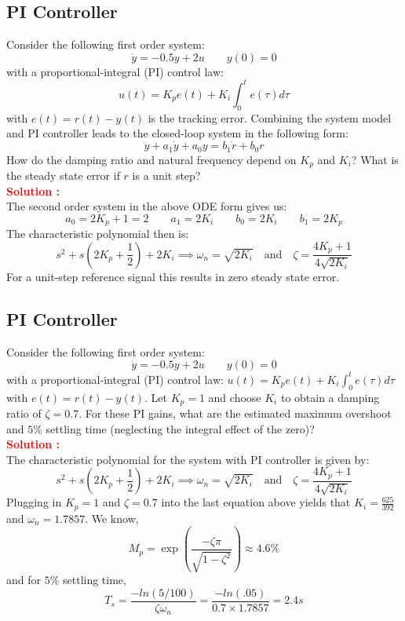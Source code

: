 \documentclass[12pt]{article}
\begin{document}
\subsection{PI Controller}

Consider the following first order system:
\[
\dot{y} = -0.5y + 2u \qquad  y(0) = 0
\]
with a proportional-integral (PI) control law: 
$$u(t)=K_p e(t)+K_i \int_0^t e(\tau) d \tau$$ with $e(t)=r(t)-y(t)$ is the tracking error. Combining the system model and PI controller leads to the closed-loop system in the following form:
\[
\ddot{y}+ a_1 \dot{y} + a_0 y = b_1 \dot{r} + b_0 r
\]
How do the damping ratio and natural frequency depend on $K_p$ and $K_i$? What is the steady state error if $r$ is a unit step? \\
\textbf{\textcolor{red}{Solution :}} \\
The second order system in the above ODE form gives us:
\[
a_0 = 2K_p + 1=2 \qquad  a_1 = 2K_i \qquad b_0 = 2K_i \qquad b_1 = 2K_p
\]
The characteristic polynomial then is:
\[
s^2 + s (2K_p + \frac{1}{2}) + 2K_i \implies \omega_n = \sqrt{2K_i} \quad \text{and} \quad \zeta = \frac{4K_p + 1}{4\sqrt{2K_i}}
\]
For a unit-step reference signal this results in zero steady state error.
\clearpage

\subsection{PI Controller}

Consider the following first order system:
\[
\dot{y} = -0.5y + 2u \qquad  y(0) = 0
\]
with a proportional-integral (PI) control law:  $u(t)=K_p e(t)+K_i \int_0^t e(\tau) d \tau$ with $e(t)=r(t)-y(t)$. Let $K_p=1$ and choose $K_i$ to obtain a damping ratio of $\zeta = 0.7$.  For these PI gains, what are the estimated maximum overshoot and $5\%$ settling time (neglecting the integral effect of the zero)? \\
\textbf{\textcolor{red}{Solution :}} \\
The characteristic polynomial for the system with PI controller is given by:
\[
s^2 + s (2K_p + \frac{1}{2}) + 2K_i \implies \omega_n = \sqrt{2K_i} \quad \text{and} \quad \zeta = \frac{4K_p + 1}{4\sqrt{2K_i}}
\]
Plugging in $K_p = 1$ and $\zeta=0.7$ into the last equation above yields that $K_i =\frac{625}{392}$ and $\omega_n=1.7857$. We know,
\[
M_p=\exp{\left(\frac{-\zeta \pi }{\sqrt{1-\zeta^2}}\right)} \approx 4.6\%
\]
and for $5\%$ settling time,
\[
T_s =\frac{-ln (5/100)}{\zeta \omega_n}=\frac{-ln (.05)}{0.7 \times 1.7857} =2.4s
\]
\clearpage
\end{document}
